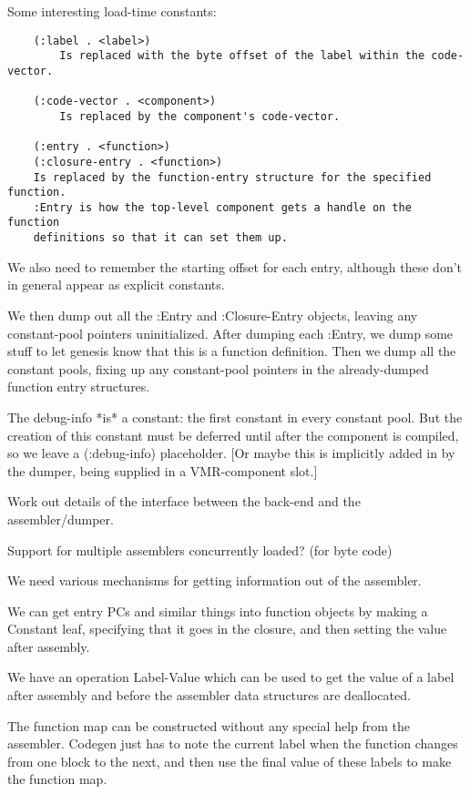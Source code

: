Some interesting load-time constants:
\begin{verbatim}
    (:label . <label>)
        Is replaced with the byte offset of the label within the code-vector.

    (:code-vector . <component>)
        Is replaced by the component's code-vector.

    (:entry . <function>)
    (:closure-entry . <function>)
	Is replaced by the function-entry structure for the specified function.
	:Entry is how the top-level component gets a handle on the function
	definitions so that it can set them up.
\end{verbatim}
We also need to remember the starting offset for each entry, although these
don't in general appear as explicit constants.

We then dump out all the :Entry and :Closure-Entry objects, leaving any
constant-pool pointers uninitialized.  After dumping each :Entry, we dump some
stuff to let genesis know that this is a function definition.  Then we dump all
the constant pools, fixing up any constant-pool pointers in the already-dumped
function entry structures.

The debug-info *is* a constant: the first constant in every constant pool.  But
the creation of this constant must be deferred until after the component is
compiled, so we leave a (:debug-info) placeholder.  [Or maybe this is
implicitly added in by the dumper, being supplied in a VMR-component slot.]


    Work out details of the interface between the back-end and the
    assembler/dumper.

    Support for multiple assemblers concurrently loaded?  (for byte code)
    
    We need various mechanisms for getting information out of the assembler.

    We can get entry PCs and similar things into function objects by making a
    Constant leaf, specifying that it goes in the closure, and then
    setting the value after assembly.

    We have an operation Label-Value which can be used to get the value of a
    label after assembly and before the assembler data structures are
    deallocated.

    The function map can be constructed without any special help from the
    assembler.  Codegen just has to note the current label when the function
    changes from one block to the next, and then use the final value of these
    labels to make the function map.

